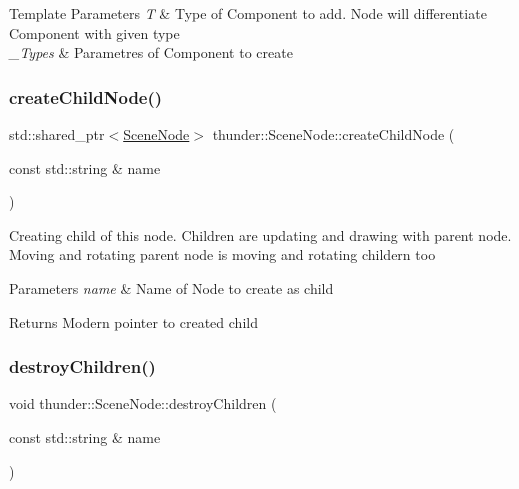 \begin{DoxyTemplParams}{Template Parameters}
{\em T} & Type of Component to add. Node will differentiate Component with given type \\
\hline
{\em \+\_\+\+Types} & Parametres of Component to create \\
\hline
\end{DoxyTemplParams}
\mbox{\label{classthunder_1_1_scene_node_abf763f599246d735a8a7f14992366d80}} 
\subsubsection{\texorpdfstring{create\+Child\+Node()}{createChildNode()}}
{\footnotesize\ttfamily std\+::shared\+\_\+ptr$<$\mbox{\hyperlink{classthunder_1_1_scene_node}{Scene\+Node}}$>$ thunder\+::\+Scene\+Node\+::create\+Child\+Node (\begin{DoxyParamCaption}\item[{const std\+::string \&}]{name }\end{DoxyParamCaption})}

Creating child of this node. Children are updating and drawing with parent node. Moving and rotating parent node is moving and rotating childern too


\begin{DoxyParams}{Parameters}
{\em name} & Name of Node to create as child \\
\hline
\end{DoxyParams}
\begin{DoxyReturn}{Returns}
Modern pointer to created child 
\end{DoxyReturn}
\mbox{\label{classthunder_1_1_scene_node_ae14866fcd4a88c33d8f01f6ada14fdbc}} 
\subsubsection{\texorpdfstring{destroy\+Children()}{destroyChildren()}}
{\footnotesize\ttfamily void thunder\+::\+Scene\+Node\+::destroy\+Children (\begin{DoxyParamCaption}\item[{const std\+::string \&}]{name }\end{DoxyParamCaption})}


